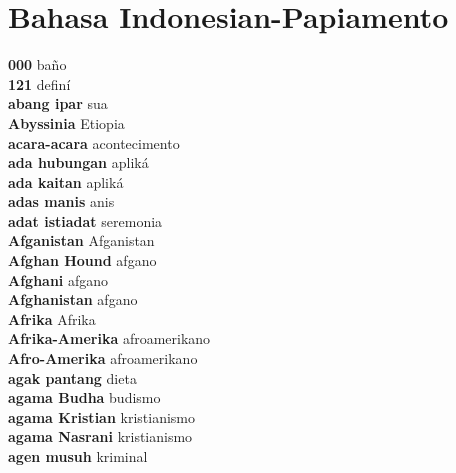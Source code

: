 \twocolumn
\chapter{Bahasa Indonesian-Papiamento}
\small
{}\textbf{ 000  } baño \\
\textbf{ 121  } definí \\
\textbf{ abang ipar  } sua \\
\textbf{ Abyssinia  } Etiopia \\
\textbf{ acara-acara  } acontecimento \\
\textbf{ ada hubungan  } apliká \\
\textbf{ ada kaitan  } apliká \\
\textbf{ adas manis  } anis \\
\textbf{ adat istiadat  } seremonia \\
\textbf{ Afganistan  } Afganistan \\
\textbf{ Afghan Hound  } afgano \\
\textbf{ Afghani  } afgano \\
\textbf{ Afghanistan  } afgano \\
\textbf{ Afrika  } Afrika \\
\textbf{ Afrika-Amerika  } afroamerikano \\
\textbf{ Afro-Amerika  } afroamerikano \\
\textbf{ agak pantang  } dieta \\
\textbf{ agama Budha  } budismo \\
\textbf{ agama Kristian  } kristianismo \\
\textbf{ agama Nasrani  } kristianismo \\
\textbf{ agen musuh  } kriminal \\
